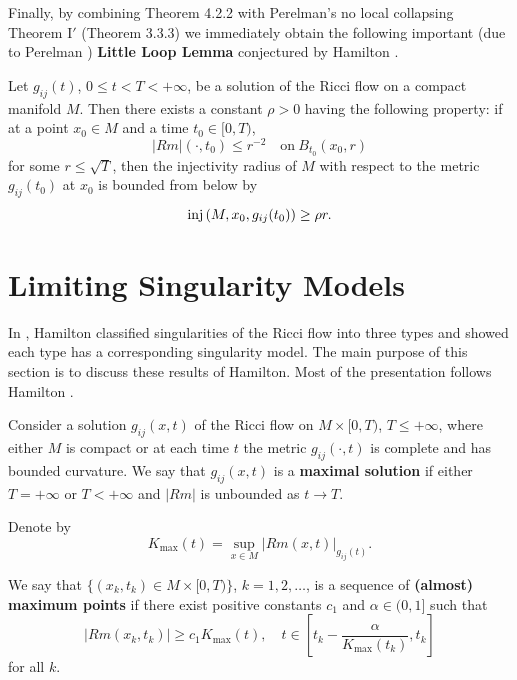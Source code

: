 \smallskip
Finally, by combining Theorem 4.2.2 with Perelman's no local
collapsing Theorem I${'}$ (Theorem 3.3.3) we immediately obtain the
following important (due to Perelman \cite{P1}) \textbf{Little Loop
Lemma}  conjectured by Hamilton
\cite{Ha95F}.

\begin{theorem}
  \label{thm:cz-little-loop-lemma}
Let $g_{ij}(t)$, $0\le t<T<+\infty$, be a solution of the Ricci
flow on a compact manifold $M$. Then there exists a constant
$\rho>0$ having the following property: if at a point $x_0\in M$
and a time $t_0\in [0,T)$,
$$ |Rm|(\cdot,t_0)\leq r^{-2} \quad
\text{on}\ B_{t_0}(x_0,r)
$$
for some $r\leq \sqrt{T}$, then the injectivity radius of $M$ with
respect to the metric $g_{ij}(t_0)$ at $x_0$ is bounded from below
by
$$
{\rm inj}\,(M,x_0,g_{ij}(t_0))\geq \rho r.
$$
\end{theorem}


\section{Limiting Singularity Models}

In \cite{Ha95F}, Hamilton classified singularities of the Ricci
flow into three types and showed each type has a corresponding
singularity model. The main purpose of this section is to discuss
these results of Hamilton. Most of the presentation follows
Hamilton \cite{Ha95F}.

Consider a solution $g_{ij}(x,t)$ of the Ricci flow on $M\times
[0,T)$, $T\le +\infty$, where either $M$ is compact or at each
time $t$ the metric $g_{ij}(\cdot,t)$ is complete and has bounded
curvature. We say that $g_{ij}(x,t)$ is a {\bf maximal solution}
 if either $T=+\infty$ or $T<+\infty$ and
$|Rm|$ is unbounded as $t\to T$.

Denote by
$$
K_{\max}(t)=\sup_{x\in M}|Rm(x,t)|_{g_{ij}(t)}.
$$

\begin{definition}
  \label{def:cz-almost-maximum-curvature-points}
We say that $\{(x_k,t_k) \in M\times [0,T) \}$, $k=1, 2, \ldots$,
is a sequence of {\bf (almost) maximum points} if there exist positive constants $c_1$ and
$\alpha \in (0,1]$ such that
$$
|Rm(x_k,t_k)|\geq c_1 K_{\max}(t), \quad t\in
[t_k-\frac{\alpha}{K_{\max}(t_k)},t_k]
$$
for all $k$.
\end{definition}

